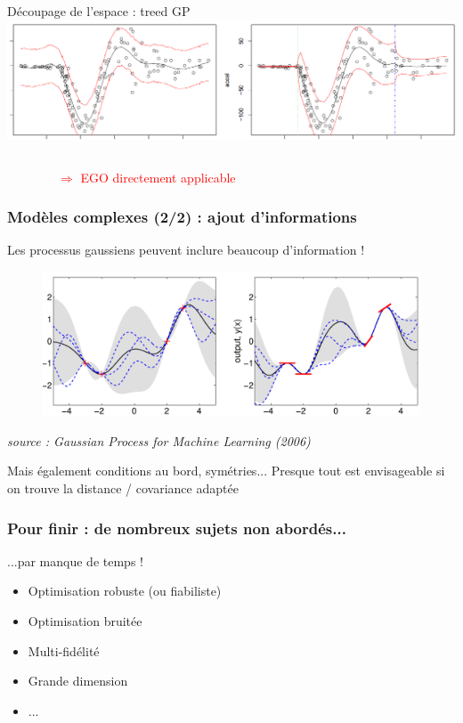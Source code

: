 \begin{frame}
\begin{columns}[t]
\begin{column}{.49\textwidth}
\begin{block}{Découpage de l'espace : treed GP}
 \includegraphics[trim= 225mm 0mm 0mm 0mm, clip, width=.85\textwidth]{fig/tgp.png}
  
\end{block}
 \end{column}
\end{columns}

\vspace{5mm}
\textcolor{red}{$\qquad \qquad \Rightarrow$ EGO directement applicable}
\end{frame}

\begin{frame}
\frametitle{Modèles complexes (2/2) : ajout d'informations}

\begin{block}{Les processus gaussiens peuvent inclure beaucoup d'information !}
\begin{figure}
	\centering
\includegraphics[trim= 0mm 0mm 0mm 0mm, clip, width=.8\textwidth]{fig/derivativeGP.png}
 \end{figure}
 \scriptsize  \textit{source : Gaussian Process for Machine Learning (2006)}
\end{block}
\normalsize
\begin{block}{Mais également conditions au bord, symétries...}
Presque tout est envisageable si on trouve la distance / covariance adaptée
\end{block}
\end{frame}

\begin{frame}
\frametitle{Pour finir : de nombreux sujets non abordés...}
\begin{block}{...par manque de temps !}
\begin{itemize}
 \item Optimisation robuste (ou fiabiliste)
 \item Optimisation bruitée
 \item Multi-fidélité
 \item Grande dimension
 \item ...
\end{itemize}
\end{block}
\end{frame}